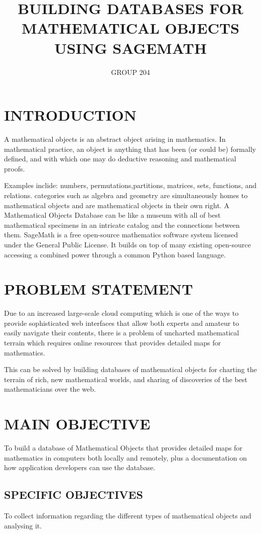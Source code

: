 \documentclass[11pt]{article} %
\title{BUILDING DATABASES FOR MATHEMATICAL OBJECTS USING SAGEMATH}
\author{GROUP 204}
\begin{document}
\maketitle

\section{INTRODUCTION}
A mathematical objects is an abstract object arising in mathematics.
In mathematical practice, an object is anything that has been (or could be) formally defined, and with which one may do deductive reasoning and mathematical proofs.

Examples inclide: numbers, permutations,partitions, matrices, sets, functions, and relations.
categories such as algebra and geometry are simultaneously homes to mathematical objects and are mathematical objects in their own right.
A Mathematical Objects Database can be like a museum with all of best
mathematical specimens in an intricate catalog and the connections
between them.
SageMath is a free open-source mathematics software
system licensed under the General Public License. It builds on top of
many existing open-source accessing a combined power through a common
Python based language.


\section{PROBLEM STATEMENT}

Due to an increased large-scale cloud computing which is one of the ways to provide sophisticated web interfaces that allow both experts and amateur to easily navigate their contents, there is a problem of uncharted mathematical terrain which requires online resources that provides detailed maps for mathematics.

 This can be solved by building databases of mathematical objects for charting the terrain of rich, new mathematical worlds, and sharing of discoveries of the best mathematicians over the web.


\section{MAIN OBJECTIVE}

To build a database of Mathematical Objects that provides detailed maps for mathematics in computers both locally and remotely, plus a documentation on how application developers can use the database.

\subsection{SPECIFIC OBJECTIVES}
 To collect information regarding the different types of mathematical objects and analysing it.
\end{document}
